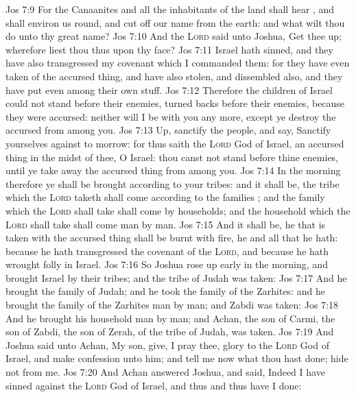\vs Jos 7:9 For the Canaanites and all the inhabitants of the land shall hear , and shall environ us round, and cut off our name from the earth: and what wilt thou do unto thy great name?
\vs Jos 7:10 And the \textsc{Lord} said unto Joshua, Get thee up; wherefore liest thou thus upon thy face?
\vs Jos 7:11 Israel hath sinned, and they have also transgressed my covenant which I commanded them: for they have even taken of the accursed thing, and have also stolen, and dissembled also, and they have put  even among their own stuff.
\vs Jos 7:12 Therefore the children of Israel could not stand before their enemies,  turned  backs before their enemies, because they were accursed: neither will I be with you any more, except ye destroy the accursed from among you.
\vs Jos 7:13 Up, sanctify the people, and say, Sanctify yourselves against to morrow: for thus saith the \textsc{Lord} God of Israel,  an accursed thing in the midst of thee, O Israel: thou canst not stand before thine enemies, until ye take away the accursed thing from among you.
\vs Jos 7:14 In the morning therefore ye shall be brought according to your tribes: and it shall be,  the tribe which the \textsc{Lord} taketh shall come according to the families ; and the family which the \textsc{Lord} shall take shall come by households; and the household which the \textsc{Lord} shall take shall come man by man.
\vs Jos 7:15 And it shall be,  he that is taken with the accursed thing shall be burnt with fire, he and all that he hath: because he hath transgressed the covenant of the \textsc{Lord}, and because he hath wrought folly in Israel.
\vs Jos 7:16 So Joshua rose up early in the morning, and brought Israel by their tribes; and the tribe of Judah was taken:
\vs Jos 7:17 And he brought the family of Judah; and he took the family of the Zarhites: and he brought the family of the Zarhites man by man; and Zabdi was taken:
\vs Jos 7:18 And he brought his household man by man; and Achan, the son of Carmi, the son of Zabdi, the son of Zerah, of the tribe of Judah, was taken.
\vs Jos 7:19 And Joshua said unto Achan, My son, give, I pray thee, glory to the \textsc{Lord} God of Israel, and make confession unto him; and tell me now what thou hast done; hide  not from me.
\vs Jos 7:20 And Achan answered Joshua, and said, Indeed I have sinned against the \textsc{Lord} God of Israel, and thus and thus have I done:
